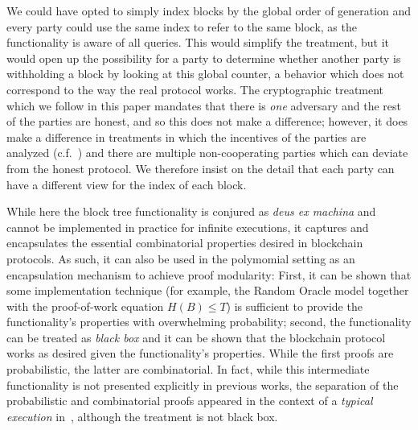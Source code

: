 \begin{remark}
We could have opted to simply index blocks by the global order of generation and
every party could use the same index to refer to the same block, as the
functionality is aware of all queries. This would simplify the treatment, but it
would open up the possibility for a party to determine whether another party is
withholding a block by looking at this global counter, a behavior which does not
correspond to the way the real protocol works. The cryptographic treatment which
we follow in this paper mandates that there is \emph{one} adversary and the rest
of the parties are honest, and so this does not make a difference; however, it
does make a difference in treatments in which the incentives of the parties are
analyzed (c.f.~\cite{C:KRDO17}) and there are multiple non-cooperating parties
which can deviate from the honest protocol. We therefore insist on the detail
that each party can have a different view for the index of each block.
\end{remark}

\begin{remark}
While here the block tree functionality is conjured as
\emph{deus ex machina} and cannot be implemented in practice for infinite
executions, it captures and encapsulates the essential combinatorial properties
desired in blockchain protocols. As such, it can also be used in the polymomial
setting as an encapsulation mechanism to achieve proof modularity: First,
it can be shown that some implementation technique (for example, the Random
Oracle model together with the proof-of-work equation $H(B) \leq T$) is
sufficient to provide the functionality's properties with overwhelming
probability; second, the functionality can be treated as \emph{black box} and it
can be shown that the blockchain protocol works as desired given the
functionality's properties. While the first proofs are probabilistic, the latter
are combinatorial. In fact, while this intermediate functionality is not
presented explicitly in previous works, the separation of the probabilistic and
combinatorial proofs appeared in the context of a \emph{typical execution}
in~\cite{EC:GarKiaLeo15}, although the treatment is not black box.
\end{remark}
